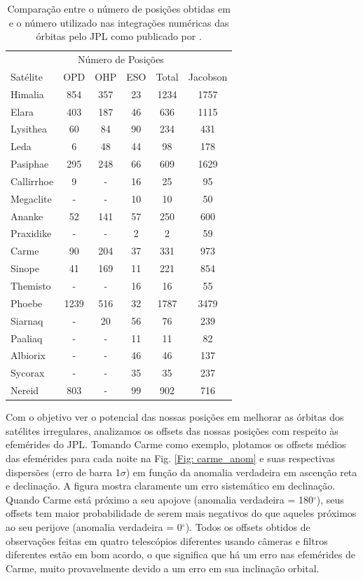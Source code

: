 \documentclass[12pt,a4paper]{monografia}
\newcommand{\degr}{\ensuremath{^{\circ}}}%
\begin{document}
\begin{table}
\caption{\label{Tab: comparison-horizons} Comparação entre o número de posições obtidas em \cite{GomesJunior2015-Irregular} e o número utilizado nas integrações numéricas das órbitas pelo JPL como publicado por  \cite{Jacobson2012}.}
\begin{centering}
\begin{tabular}{lccccc}
\hline  \hline
 & \multicolumn{4}{c}{Número de Posições}   &    \tabularnewline
Satélite  & OPD  & OHP & ESO & Total  & Jacobson \tabularnewline
\hline
Himalia & 854 & 357 & 23 & 1234 & 1757 \tabularnewline
Elara & 403 & 187 & 46 & 636 & 1115 \tabularnewline
Lysithea & 60 & 84 & 90 & 234 & 431 \tabularnewline
Leda & 6 & 48 & 44 & 98 & 178 \tabularnewline
\hdashline
Pasiphae & 295 & 248 & 66 & 609 & 1629 \tabularnewline
Callirrhoe & 9 & -  &  16 & 25 & 95 \tabularnewline
Megaclite & - & -  &  10 & 10 & 50  \tabularnewline
\hdashline
Ananke & 52 & 141 & 57 & 250 & 600 \tabularnewline
Praxidike & - & -  &   2 & 2 & 59 \tabularnewline
\hdashline
Carme & 90 & 204 & 37 & 331 & 973 \tabularnewline
Sinope & 41 & 169 & 11 & 221 & 854 \tabularnewline
Themisto & - & - & 16 & 16 & 55 \tabularnewline
\hline
Phoebe & 1239 & 516 & 32 & 1787 & 3479 \tabularnewline
\hdashline
Siarnaq & - & 20 & 56 & 76 & 239 \tabularnewline
Paaliaq & - & - & 11 & 11 & 82 \tabularnewline
\hdashline
Albiorix & - & - & 46 & 46 & 137 \tabularnewline
\hline
Sycorax & - & - & 35 & 35 & 237 \tabularnewline
\hline
Nereid & 803 & - & 99 & 902 & 716 \tabularnewline
\hline
\end{tabular}
\par\end{centering}
\end{table}

Com o objetivo ver o potencial das nossas posições em melhorar as órbitas dos satélites irregulares, analizamos os offsets das nossas posições com respeito às efemérides do JPL. Tomando Carme como exemplo, plotamos os offsets médios das efemérides para cada noite na Fig. \ref{Fig: carme_anom} e suas respectivas dispersões (erro de barra 1$\sigma$) em função da anomalia verdadeira em ascenção reta e declinação. A figura mostra claramente um erro sistemático em declinação. Quando Carme está próximo a seu apojove (anomalia verdadeira = 180$\degr$), seus offsets tem maior probabilidade de serem mais negativos do que aqueles próximos ao seu perijove (anomalia verdadeira = 0$\degr$). Todos os offsets obtidos de observações feitas em quatro telescópios diferentes usando câmeras e filtros diferentes estão em bom acordo, o que significa que há um erro nas efemérides de Carme, muito provavelmente devido a um erro em sua inclinação orbital.
\end{document}
